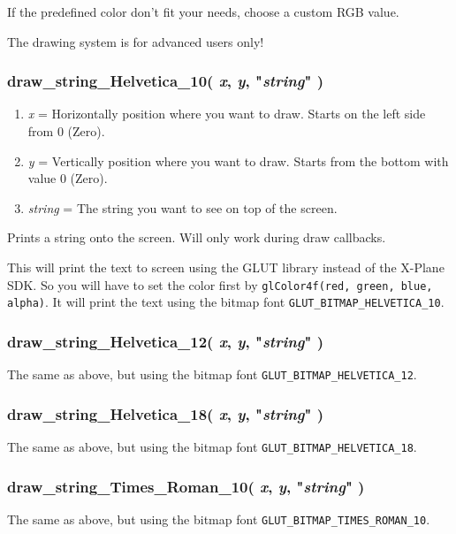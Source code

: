 \documentclass[11pt,parskip=half,a4paper]{scrartcl}
\begin{document}
If the predefined color don't fit your needs, choose a custom RGB value.

The drawing system is for advanced users only!

\subsubsection{draw\_string\_Helvetica\_10( \emph{x}, \emph{y}, "\emph{string}" )}

\begin{enumerate}
	\item \emph{x} = Horizontally position where you want to draw. Starts on the left side from 0 (Zero).
	\item \emph{y} = Vertically position where you want to draw. Starts from the bottom with value 0 (Zero).
	\item \emph{string} = The string you want to see on top of the screen.
\end{enumerate}

Prints a string onto the screen. Will only work during draw callbacks.

This will print the text to screen using the GLUT library instead of the X-Plane SDK. So you will have to set the color first by \verb|glColor4f(red, green, blue, alpha)|. It will print the text using the bitmap font \verb|GLUT_BITMAP_HELVETICA_10|.

\subsubsection{draw\_string\_Helvetica\_12( \emph{x}, \emph{y}, "\emph{string}" )}

The same as above, but using the bitmap font \verb|GLUT_BITMAP_HELVETICA_12|.

\subsubsection{draw\_string\_Helvetica\_18( \emph{x}, \emph{y}, "\emph{string}" )}

The same as above, but using the bitmap font \verb|GLUT_BITMAP_HELVETICA_18|.

\subsubsection{draw\_string\_Times\_Roman\_10( \emph{x}, \emph{y}, "\emph{string}" )}

The same as above, but using the bitmap font \verb|GLUT_BITMAP_TIMES_ROMAN_10|.
\end{document}
